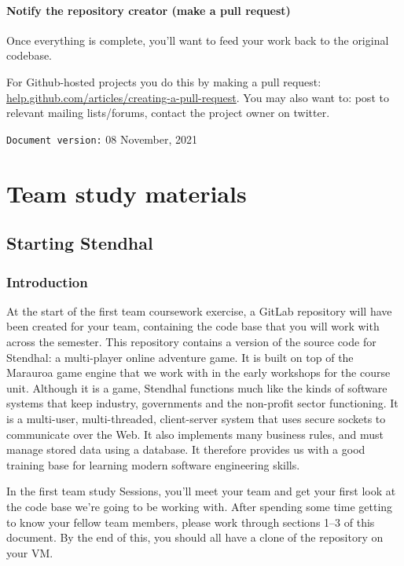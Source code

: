 \documentclass[
]{book}
\begin{document}
\hypertarget{pullrequest}{%
\subsection{Notify the repository creator (make a pull request)}\label{pullrequest}}

Once everything is complete, you'll want to feed your work back to the original codebase.

For Github-hosted projects you do this by making a pull request: \href{https://help.github.com/articles/creating-a-pull-request}{help.github.com/articles/creating-a-pull-request}. You may also want to: post to relevant mailing lists/forums, contact the project owner on twitter.

\texttt{Document\ version:} 08 November, 2021

\hypertarget{part-team-study-materials}{%
\part{Team study materials}\label{part-team-study-materials}}

\hypertarget{starting}{%
\chapter{Starting Stendhal}\label{starting}}

\hypertarget{introduction-2}{%
\section{Introduction}\label{introduction-2}}

At the start of the first team coursework exercise, a GitLab repository will have been created for your team, containing the code base that you will work with across the semester. This repository contains a version of the source code for Stendhal: a multi-player online adventure game. It is built on top of the Marauroa game engine that we work with in the early workshops for the course unit. Although it is a game, Stendhal functions much like the kinds of software systems that keep industry, governments and the non-profit sector functioning. It is a multi-user, multi-threaded, client-server system that uses secure sockets to communicate over the Web. It also implements many business rules, and must manage stored data using a database. It therefore provides us with a good training base for learning modern software engineering skills.

In the first team study Sessions, you'll meet your team and get your first look at the code base we're going to be working with. After spending some time getting to know your fellow team members, please work through sections 1--3 of this document. By the end of this, you should all have a clone of the repository on your VM.
\end{document}

